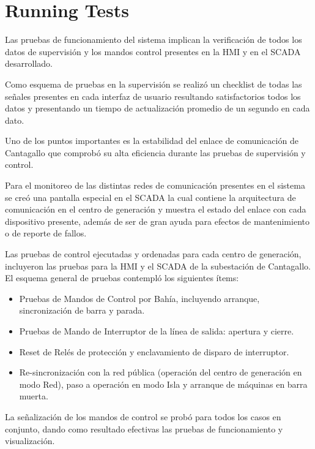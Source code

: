 
\section{Running Tests}




Las pruebas de funcionamiento del sistema implican la verificación de todos los datos de supervisión y los mandos control presentes en la HMI y en el SCADA desarrollado.

Como esquema de pruebas en la supervisión se realizó  un checklist de todas las señales presentes en cada interfaz de usuario resultando satisfactorios todos los datos y presentando un tiempo de actualización promedio de un segundo en cada dato.

Uno de los puntos importantes es la estabilidad del enlace de comunicación de Cantagallo que comprobó su alta eficiencia durante las pruebas de supervisión y control.

Para el monitoreo de las distintas redes de comunicación presentes en el sistema se creó una pantalla especial en el SCADA la cual contiene la arquitectura de comunicación en el centro de generación y muestra el estado del enlace con cada dispositivo presente, además de ser de gran ayuda para efectos de mantenimiento o de reporte de fallos.

Las pruebas de control ejecutadas y ordenadas para cada centro de generación, incluyeron las pruebas para la HMI y el SCADA de la subestación de Cantagallo. El esquema general de pruebas contempló los siguientes ítems:

\begin{itemize}
\item Pruebas de Mandos de Control por Bahía, incluyendo arranque, sincronización de barra y parada.
\item Pruebas de Mando de Interruptor de la línea de salida: apertura y cierre.
\item Reset de Relés de protección y enclavamiento de disparo de interruptor.
\item Re-sincronización con la red pública (operación del centro de generación en modo Red), paso a operación en modo Isla y arranque de máquinas en barra muerta.
\end{itemize}

La señalización de los mandos de control se probó para todos los casos en conjunto, dando como resultado efectivas las pruebas de funcionamiento y visualización.

